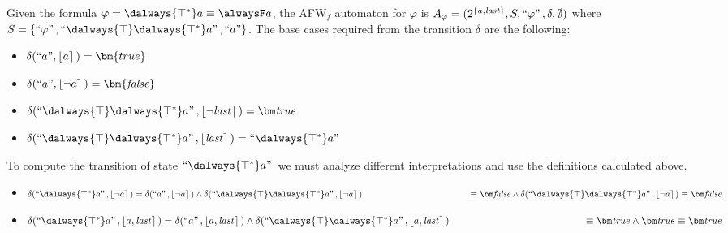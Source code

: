 
\newpage
\begin{example}
    Given the formula $\varphi= \dalways{\top ^*}a \equiv \alwaysF a$, the AFW$_f$ automaton for $\varphi$ is $A_\varphi =(2^{\{a,\mathit{last}\}},S,``\varphi"\,,\delta,\emptyset)$ where $S=\{\s{\varphi},\s{\dalways{\top}\dalways{\top ^*}a},``a"\}$. The base cases required from the transition $\delta$ are the following:

    \begin{multicols}{2}
        \small
        \begin{itemize}
            \item $\delta(``a",\interp{ a })=\bm{true}$
            \item $\delta(``a",\interp{ \neg a })=\bm{\mathit{false}}$
        \end{itemize}
    \end{multicols}
    \begin{itemize}
        \small
        \item $\delta(\s{\dalways{\top}\dalways{\top ^*}a},\interp{ \neg \last})=\tpbf$
        \item $\delta(\s{\dalways{\top}\dalways{\top ^*}a},\interp{\last})=\s{\dalways{\top ^*}a}$
    \end{itemize}

    To compute the transition of state $\s{\dalways{\top ^*}a}$ we must analyze different interpretations and use the definitions calculated above.

    \begin{itemize}
        
        \small
        \item $\delta(\s{\dalways{\top ^*}a},\interp{\neg a}) = \delta(\s{a},\interp{\neg a}) \wedge \delta(\s{\dalways{\top}\dalways{\top ^*}a},\interp{\neg a}) \\\phantom{\delta(\s{\dalways{\top ^*}a},\interp{\neg a})} \equiv  \fpbf \wedge \delta(\s{\dalways{\top}\dalways{\top ^*}a},\interp{\neg a}) \equiv \fpbf$ 
        
        \item $\delta(\s{\dalways{\top ^*}a},\interp{a, \last}) = \delta(\s{a},\interp{a, \last}) \wedge \delta(\s{\dalways{\top}\dalways{\top ^*}a},\interp{a, \last}) \\\phantom{\delta(\s{\dalways{\top ^*}a},\interp{a, \last})} \equiv  \tpbf \wedge \tpbf \equiv \tpbf$ 
        

\end{itemize}
\end{example}
